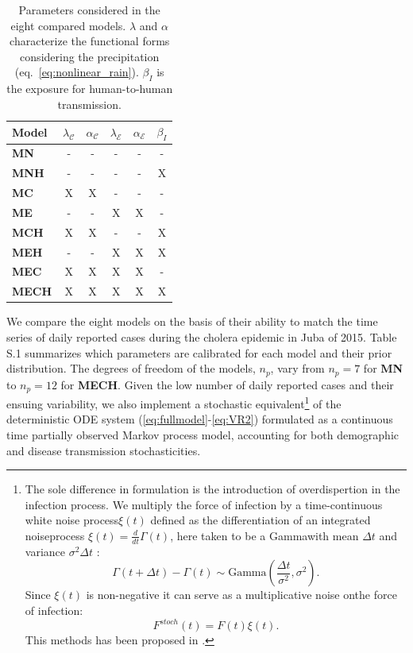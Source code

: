\begin{table}[h!]
\centering
\begin{tabular}{lccccc}
\toprule
     Model       & $\lambda_{\mathcal{C}}$ & $\alpha_\mathcal{C}$ & $\lambda_{\mathcal{E}}$ & $\alpha_\mathcal{E}$ & $\beta_I$   \\
    \hline
    \textbf{MN} &       -    &    -   &       -      &       -      &  - \\
    \textbf{MNH} &     -      &   -    &    -         &        -     &   X\\
    \textbf{MC} &       X   &   X   &     -        &       -      &  - \\
    \textbf{ME} &         -  &   -    &       X     &    X         & -  \\
    \textbf{MCH}&       X   &   X   &      -       &     -        & X  \\
    \textbf{MEH}&        -   &  -     &       X     &    X         & X  \\
    \textbf{MEC}&       X  &   X   &       X     &     X       & -\\
    \textbf{MECH}&       X  &   X   &       X     &     X        &   X\\
\bottomrule
\end{tabular}
\caption{Parameters considered in the eight compared models.  $\lambda$ and $\alpha$ characterize the functional forms considering the precipitation (eq.~\ref{eq:nonlinear_rain}). $\beta_I$ is the exposure for human-to-human transmission.}
\label{tab:models}
\end{table}

We compare the eight models on the basis of their ability to match the time series of daily reported cases during the cholera epidemic in Juba of 2015. Table S.1 summarizes which parameters are calibrated for each model and their prior distribution. The degrees of freedom of the models, $n_p$, vary from $n_p=7$ for \textbf{MN} to $n_p=12$ for \textbf{MECH}. Given the low number of daily reported cases and their ensuing variability, we also implement a stochastic equivalent\footnote[][-5\baselineskip]{The sole difference in formulation is the introduction of overdispertion in the infection process. We multiply the force of infection by a time-continuous white noise process\(\xi(t)\) defined as the differentiation of an integrated noiseprocess \(\xi(t) = \frac{d}{dt}\Gamma(t)\), here taken to be a Gammawith mean \(\Delta t\) and variance \(\sigma^2 \Delta t\) : \[
\Gamma (t+\Delta t) - \Gamma (t) \sim \text{Gamma}\left( \frac{\Delta t}{\sigma^2}, \sigma^2\right). \]
Since \(\xi(t)\) is non-negative it can serve as a multiplicative noise onthe force of infection: \[ F^{stoch}(t) = F(t) \xi(t). \]This methods has been proposed in .} of the deterministic ODE system (\ref{eq:fullmodel}-\ref{eq:VR2}) formulated as a continuous time partially observed Markov process model, accounting for both demographic and disease transmission stochasticities\cite{Breto:TimeSeriesAnalysis:2009}. 

